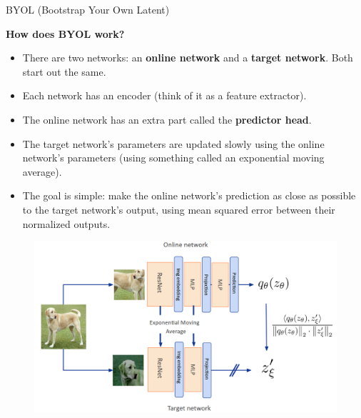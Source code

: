 \begin{frame}[allowframebreaks]{BYOL (Bootstrap Your Own Latent)}
\framebreak

\textbf{How does BYOL work?}
\begin{itemize}
    \item There are two networks: an \textbf{online network} and a \textbf{target network}. Both start out the same.
    \item Each network has an encoder (think of it as a feature extractor).
    \item The online network has an extra part called the \textbf{predictor head}.
    \item The target network's parameters are updated slowly using the online network's parameters (using something called an exponential moving average).
    \item The goal is simple: make the online network's prediction as close as possible to the target network's output, using mean squared error between their normalized outputs.
\end{itemize}

\framebreak

\begin{figure}
    \centering
    \includegraphics[width=\linewidth,height=0.9\textheight,keepaspectratio]{images/contrastive/slide_82_1_img.png}
\end{figure}

\framebreak


\end{frame}
